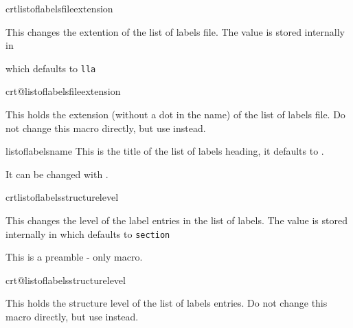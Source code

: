 \documentclass[12pt,a4paper,oneside]{article}
\makeatletter
\newcommand{\chdocextractversion}[1]{%
  \@nameuse{#1}%
}
\makeatother
\begin{document}
\begin{docCommand}[doc new={\chdocextractversion{crossreftoolsversion0.4}}]{crtlistoflabelsfileextension}{}

This changes the extention of the list of labels file. The value is stored internally in

  which defaults to \texttt{lla}

\end{docCommand}

\begin{docCommand}[doc new={\chdocextractversion{crossreftoolsversion0.4}}]{crt@listoflabelsfileextension}{}

This holds the extension (without a dot in the name) of the list of labels file. Do not change this macro directly, but use  instead. 

\end{docCommand}


\begin{docCommand}[doc new={\chdocextractversion{crossreftoolsversion0.4}}]{listoflabelsname}{}
This is the title of the list of labels heading, it defaults to \texttt{\listoflabelsname}. 

It can be changed with . 

\end{docCommand}




\begin{docCommand}[doc new={\chdocextractversion{crossreftoolsversion0.4}}]{crtlistoflabelsstructurelevel}{}

This changes the level of the label entries in the list of labels. The value is stored internally in  which defaults to \texttt{section}

\begin{marker}
This is a preamble - only macro. 
\end{marker}
\end{docCommand}

\begin{docCommand}[doc new={\chdocextractversion{crossreftoolsversion0.4}}]{crt@listoflabelsstructurelevel}{}

This holds the structure level of the list of labels entries. Do not change this macro directly, but use  instead. 

\end{docCommand}
\end{document}
